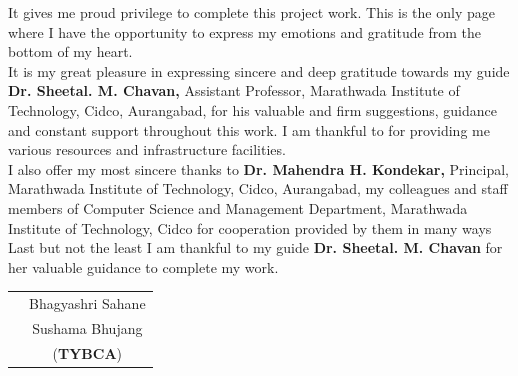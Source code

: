 \documentclass[12pt, a4paper]{report}
\begin{document}

{  \newpage {\bfseries \fontsize{14}{12} \selectfont \begin{center}{Acknowledgments}\end{center} 
		\vspace*{2\baselineskip}} \setlength{\parindent}{11mm} }
{ \setlength{\parindent}{0mm} }
\begin{spacing}{1.5}
It gives me proud privilege to complete this project work. This is the only page where I have the opportunity to express my emotions and gratitude from the bottom of my heart.
\vspace*{1\baselineskip}\\
It is my great pleasure in expressing sincere and deep gratitude towards my guide \textbf{Dr. Sheetal. M. Chavan,} Assistant Professor, Marathwada Institute of Technology, Cidco, Aurangabad, for his valuable and firm suggestions, guidance and constant support throughout this work. I am thankful to for providing me various resources and infrastructure facilities.   \vspace*{1\baselineskip}\\
I also offer my most sincere thanks to \textbf{Dr. Mahendra H. Kondekar,} Principal, Marathwada Institute of Technology, Cidco, Aurangabad, my colleagues and staff members of Computer Science and Management Department, Marathwada Institute of Technology, Cidco for cooperation provided by them in many ways
\vspace*{1\baselineskip}\\
Last but not the least I am thankful to my guide \textbf{Dr. Sheetal. M. Chavan} for her
valuable guidance to complete my work.
\vspace*{3\baselineskip} \\
\end{spacing}
\begin{tabular}{p{10.2cm}c}
	&Bhagyashri Sahane \\
	&Sushama Bhujang\\
	\vspace*{2\baselineskip}
	&(\textbf{TYBCA})
\end{tabular}

	\tableofcontents
	\listoffigures
	\listoftables
	
\end{document}
